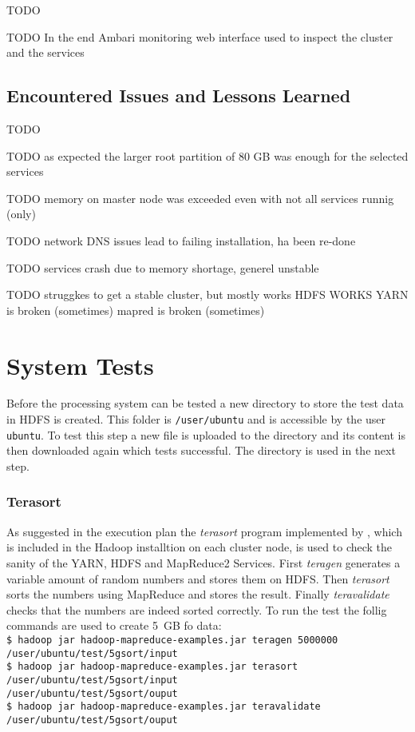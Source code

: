 TODO

TODO In the end Ambari monitoring web interface used to inspect the cluster and the services

\subsection{Encountered Issues and Lessons Learned}
TODO

TODO as expected the larger root partition of 80 GB was enough for the selected services

TODO memory on master node was exceeded even with not all services runnig (only)

TODO network DNS issues lead to failing installation, ha been re-done

TODO services crash due to memory shortage, generel unstable

TODO struggkes to get a stable cluster, but mostly works
HDFS WORKS
YARN is broken (sometimes)
mapred is broken (sometimes)


\section{System Tests}

Before the processing system can be tested a new directory to store the test data in \ac{HDFS}
is created. 
This folder is \texttt{/user/ubuntu} and is accessible by the user \texttt{ubuntu}.
To test this step a new file is uploaded to the directory and its content is then downloaded again which tests successful. The directory is used in the next step.

\subsubsection{Terasort}

As suggested in the execution plan the \emph{terasort} program implemented by \textcite{omally2008terasort}, which is included in the Hadoop installtion on each cluster node, is used to check the sanity of the \ac{YARN}, \ac{HDFS} and MapReduce2 Services.
First \emph{teragen} generates a variable amount of random numbers and stores them on \ac{HDFS}. Then \emph{terasort} sorts the numbers using MapReduce and stores the result.
Finally \emph{teravalidate} checks that the numbers are indeed sorted correctly.
To run the test the follig commands are used to create 5~\ac{GB} fo data:\\
\texttt{\$ hadoop jar hadoop-mapreduce-examples.jar teragen 5000000\\  /user/ubuntu/test/5gsort/input}\\ 
\texttt{\$ hadoop jar hadoop-mapreduce-examples.jar terasort\\ /user/ubuntu/test/5gsort/input\\ /user/ubuntu/test/5gsort/ouput}\\ 
\texttt{\$ hadoop jar hadoop-mapreduce-examples.jar teravalidate\\  /user/ubuntu/test/5gsort/ouput}

